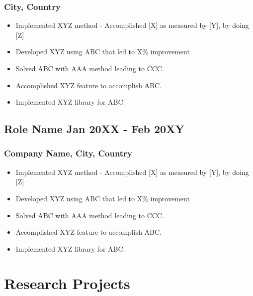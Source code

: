 \documentclass[11pt]{article}
\begin{document}
    \subsubsection{City, Country}

    \begin{itemize}
        \item[\checkmark] Implemented XYZ method - Accomplished [X] as measured by [Y], by doing [Z] 
        \item[\checkmark]  Developed XYZ using ABC that led to X\% improvement 
        \item[\checkmark] Solved ABC with AAA method leading to CCC.
        \item[\checkmark]  Accomplished XYZ feature to accomplish ABC.
        \item[\checkmark]  Implemented XYZ library for ABC.
    \end{itemize}
    
    \subsection{Role Name \hfill \normalfont Jan 20XX - Feb 20XY}
    \subsubsection{Company Name, City, Country}

    \begin{itemize}
        \item[\checkmark] Implemented XYZ method - Accomplished [X] as measured by [Y], by doing [Z] 
        \item[\checkmark]  Developed XYZ using ABC that led to X\% improvement 
        \item[\checkmark] Solved ABC with AAA method leading to CCC.
        \item[\checkmark]  Accomplished XYZ feature to accomplish ABC.
        \item[\checkmark]  Implemented XYZ library for ABC.
    \end{itemize}

    \section{Research Projects}
\end{document}
